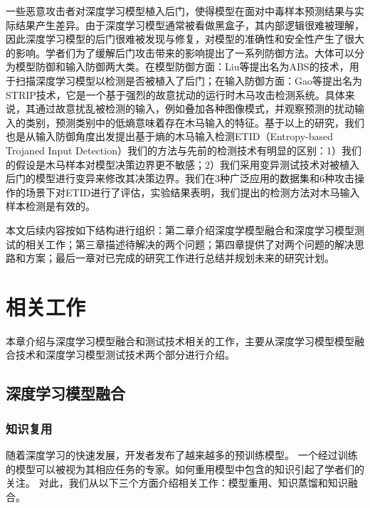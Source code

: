 \documentclass[fontset=macnew,UTF8]{article} %
\begin{document}
一些恶意攻击者对深度学习模型植入后门\cite{liu2020survey,kaviani2021defense,li2022backdoor}，使得模型在面对中毒样本预测结果与实际结果产生差异。由于深度学习模型通常被看做黑盒子，其内部逻辑很难被理解，因此深度学习模型的后门很难被发现与修复，对模型的准确性和安全性产生了很大的影响。学者们为了缓解后门攻击带来的影响提出了一系列防御方法。大体可以分为模型防御和输入防御两大类。在模型防御方面：Liu等\cite{liu2019abs}提出名为ABS的技术，用于扫描深度学习模型以检测是否被植入了后门；在输入防御方面：Gao等\cite{gao2019strip}提出名为STRIP技术，它是一个基于强烈的故意扰动的运行时木马攻击检测系统。具体来说，其通过故意扰乱被检测的输入，例如叠加各种图像模式，并观察预测的扰动输入的类别，预测类别中的低熵意味着存在木马输入的特征。基于以上的研究，我们也是从输入防御角度出发提出基于熵的木马输入检测ETID（Entropy-based Trojaned Input Detection）我们的方法与先前的检测技术有明显的区别：1）我们的假设是木马样本对模型决策边界更不敏感；2）我们采用变异测试技术对被植入后门的模型进行变异来修改其决策边界。我们在3种广泛应用的数据集和6种攻击操作的场景下对ETID进行了评估，实验结果表明，我们提出的检测方法对木马输入样本检测是有效的。

本文后续内容按如下结构进行组织：第二章介绍深度学模型融合和深度学习模型测试的相关工作；第三章描述待解决的两个问题；第四章提供了对两个问题的解决思路和方案；最后一章对已完成的研究工作进行总结并规划未来的研究计划。

\section{相关工作}
本章介绍与深度学习模型融合和测试技术相关的工作，主要从深度学习模型模型融合技术和深度学习模型测试技术两个部分进行介绍。

\subsection{深度学习模型融合}
\subsubsection{知识复用}
随着深度学习的快速发展，开发者发布了越来越多的预训练模型。 一个经过训练的模型可以被视为其相应任务的专家\cite{yang2017deep}。如何重用模型中包含的知识引起了学者们的关注。 对此，我们从以下三个方面介绍相关工作：模型重用、知识蒸馏和知识融合。
\end{document}
